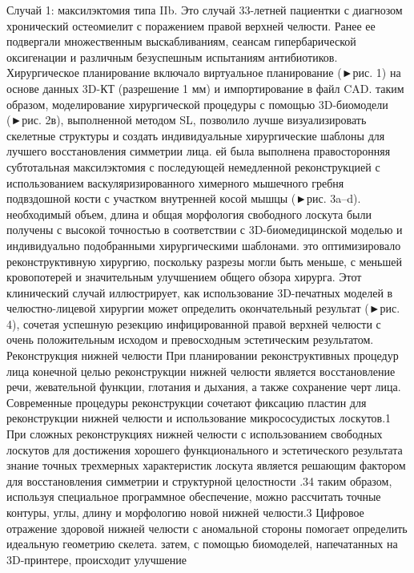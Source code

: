 Случай 1: максилэктомия типа IIb. Это случай 33-летней пациентки с диагнозом
хронический остеомиелит с поражением правой верхней челюсти. Ранее ее подвергали
множественным выскабливаниям, сеансам гипербарической оксигенации и различным
безуспешным испытаниям антибиотиков. Хирургическое планирование включало
виртуальное планирование (►рис. 1) на основе данных 3D-КТ (разрешение 1 мм) и
импортирование в файл CAD. таким образом, моделирование хирургической процедуры
с помощью 3D-биомодели (►рис. 2в), выполненной методом SL, позволило лучше
визуализировать скелетные структуры и создать индивидуальные хирургические
шаблоны для лучшего восстановления симметрии лица. ей была выполнена
правосторонняя субтотальная максилэктомия с последующей немедленной
реконструкцией с использованием васкуляризированного химерного мышечного гребня
подвздошной кости с участком внутренней косой мышцы (►рис. 3a–d). необходимый
объем, длина и общая морфология свободного лоскута были получены с высокой
точностью в соответствии с 3D-биомедицинской моделью и индивидуально
подобранными хирургическими шаблонами. это оптимизировало реконструктивную
хирургию, поскольку разрезы могли быть меньше, с меньшей кровопотерей и
значительным улучшением общего обзора хирурга. Этот клинический случай
иллюстрирует, как использование 3D-печатных моделей в челюстно-лицевой хирургии
может определить окончательный результат (►рис. 4), сочетая успешную резекцию
инфицированной правой верхней челюсти с очень положительным исходом и
превосходным эстетическим результатом. Реконструкция нижней челюсти При
планировании реконструктивных процедур лица конечной целью реконструкции нижней
челюсти является восстановление речи, жевательной функции, глотания и дыхания, а
также сохранение черт лица. Современные процедуры реконструкции сочетают
фиксацию пластин для реконструкции нижней челюсти и использование
микрососудистых лоскутов.1 При сложных реконструкциях нижней челюсти с
использованием свободных лоскутов для достижения хорошего функционального и
эстетического результата знание точных трехмерных характеристик лоскута является
решающим фактором для восстановления симметрии и структурной целостности .34
таким образом, используя специальное программное обеспечение, можно рассчитать
точные контуры, углы, длину и морфологию новой нижней челюсти.3 Цифровое
отражение здоровой нижней челюсти с аномальной стороны помогает определить
идеальную геометрию скелета. затем, с помощью биомоделей, напечатанных на
3D-принтере, происходит улучшение

